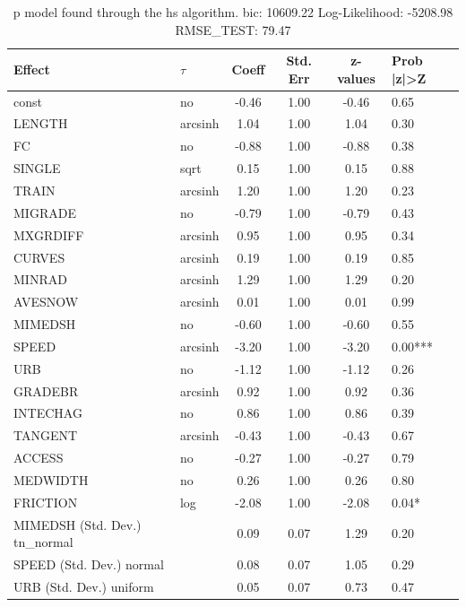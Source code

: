\begin{table}
	\caption{p model found through the hs algorithm. bic: 10609.22 Log-Likelihood: -5208.98 RMSE_TEST: 79.47}
	\begin{center}
		\begin{tabular}{|l|l|c|c|c|l|}
			\hline
			Effect & $\tau$ & Coeff & Std. Err & z-values & Prob |z|>Z \\
			\hline
			const & no & -0.46 & 1.00 & -0.46 & 0.65 \\
			\hline
			LENGTH & arcsinh & 1.04 & 1.00 & 1.04 & 0.30 \\
			\hline
			FC & no & -0.88 & 1.00 & -0.88 & 0.38 \\
			\hline
			SINGLE & sqrt & 0.15 & 1.00 & 0.15 & 0.88 \\
			\hline
			TRAIN & arcsinh & 1.20 & 1.00 & 1.20 & 0.23 \\
			\hline
			MIGRADE & no & -0.79 & 1.00 & -0.79 & 0.43 \\
			\hline
			MXGRDIFF & arcsinh & 0.95 & 1.00 & 0.95 & 0.34 \\
			\hline
			CURVES & arcsinh & 0.19 & 1.00 & 0.19 & 0.85 \\
			\hline
			MINRAD & arcsinh & 1.29 & 1.00 & 1.29 & 0.20 \\
			\hline
			AVESNOW & arcsinh & 0.01 & 1.00 & 0.01 & 0.99 \\
			\hline
			MIMEDSH & no & -0.60 & 1.00 & -0.60 & 0.55 \\
			\hline
			SPEED & arcsinh & -3.20 & 1.00 & -3.20 & 0.00*** \\
			\hline
			URB & no & -1.12 & 1.00 & -1.12 & 0.26 \\
			\hline
			GRADEBR & arcsinh & 0.92 & 1.00 & 0.92 & 0.36 \\
			\hline
			INTECHAG & no & 0.86 & 1.00 & 0.86 & 0.39 \\
			\hline
			TANGENT & arcsinh & -0.43 & 1.00 & -0.43 & 0.67 \\
			\hline
			ACCESS & no & -0.27 & 1.00 & -0.27 & 0.79 \\
			\hline
			MEDWIDTH & no & 0.26 & 1.00 & 0.26 & 0.80 \\
			\hline
			FRICTION & log & -2.08 & 1.00 & -2.08 & 0.04* \\
			\hline
			MIMEDSH (Std. Dev.) tn_normal &  & 0.09 & 0.07 & 1.29 & 0.20 \\
			\hline
			SPEED (Std. Dev.) normal &  & 0.08 & 0.07 & 1.05 & 0.29 \\
			\hline
			URB (Std. Dev.) uniform &  & 0.05 & 0.07 & 0.73 & 0.47 \\

\end{tabular}
\end{center}
\end{table}
